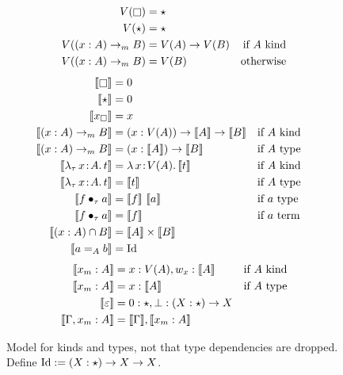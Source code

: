 
\begin{figure}
    \centering
    \begin{align*}
        V(\kind) &= \star \\
        V(\star) &= \star \\
        V((x : A) \to_m B) &= V(A) \to V(B) &\text{if} \text{ $A$ kind} \\
        V((x : A) \to_m B) &= V(B) &\text{otherwise}
    \end{align*}
    \begin{align*}
        \sema{\kind} &= 0 \\
        \sema{\star} &= 0 \\
        \sema{x_\square} &= x \\
        \sema{(x : A) \to_m B} &= (x : V(A)) \to \sema{A} \to \sema{B} &\text{if}& \text{ $A$ kind} \\
        \sema{(x : A) \to_m B} &= (x : \sema{A}) \to \sema{B} &\text{if}& \text{ $A$ type} \\
        \sema{\abs{\lambda_\tau}{x}{A}{t}} &= \abs{\lambda}{x}{V(A)}{\sema{t}} &\text{if}& \text{ $A$ kind} \\
        \sema{\abs{\lambda_\tau}{x}{A}{t}} &= \sema{t} &\text{if}& \text{ $A$ type} \\
        \sema{\app{f}{\tau}{a}} &= \sema{f}\ \sema{a} &\text{if}& \text{ $a$ type} \\
        \sema{\app{f}{\tau}{a}} &= \sema{f} &\text{if}& \text{ $a$ term} \\
        \sema{(x : A) \cap B} &= \sema{A} \times \sema{B} \\
        \sema{a =_A b} &= \fpId
    \end{align*}
    \begin{align*}
        \llbracket x_m : A \rrbracket &= x : V(A), w_x : \llbracket A \rrbracket &\text{if}& \text{ $A$ kind} \\
        \llbracket x_m : A \rrbracket &= x : \llbracket A \rrbracket &\text{if}& \text{ $A$ type} \\
        \llbracket \varepsilon \rrbracket &= 0 : \star, \bot : (X : \star) \to X \\
        \llbracket \Gamma, x_m : A \rrbracket &= \llbracket \Gamma \rrbracket, \llbracket x_m : A \rrbracket
    \end{align*}
    \caption{
        Model for kinds and types, not that type dependencies are dropped.
        Define $\textnormal{Id} := (X : \star) \to X \to X$.
    }
    \label{fig:3:model_types}
\end{figure}

